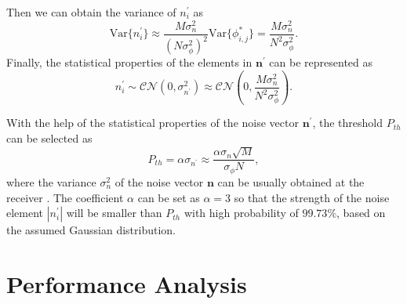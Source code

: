 \documentclass[conference]{IEEEtran}
\begin{document}
Then we can obtain the variance of $n_i^{'}$ as
\begin{equation}
\text{Var}\{n_i^{'}\}\approx\frac{M\sigma_n^2}{(N\sigma_{\phi}^2)^2}\text{Var}\{\phi_{i,j}^{*}\}=\frac{M\sigma_n^2}{N^2\sigma_{\phi}^2}.
\end{equation}
Finally, the statistical properties of the elements in $\mathbf{n}^{'}$ can be represented as
\begin{equation}
\label{n'=n}
n_i^{'}\sim\mathcal{CN}(0, \sigma_{n^{'}}^2)\approx\mathcal{CN}(0,\frac{M\sigma_n^2}{N^2\sigma_{\phi}^2}).
\end{equation}

With the help of the statistical properties of the noise vector $\mathbf{n}^{'}$, the threshold $P_{th}$ can be selected as
\begin{equation}
\label{th}
P_{th} = \alpha\sigma_{n^{'}}\approx\frac{\alpha\sigma_{n}\sqrt{M}}{\sigma_{\phi}N},
\end{equation}
where the variance $\sigma_n^2$ of the noise vector $\mathbf{n}$ can be usually obtained at the receiver \cite{SNRDetection}.
The coefficient $\alpha$ can be set as $\alpha=3$ so that the strength of the noise element $|n_i^{'}|$ will be smaller than $P_{th}$ with high probability of $99.73\%$, based on the assumed Gaussian distribution.


\section{Performance Analysis}

\end{document}
